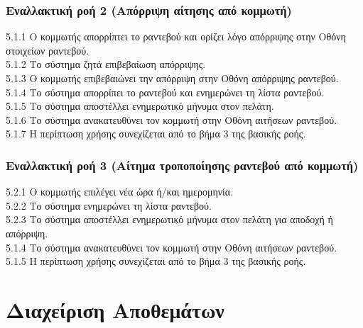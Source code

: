 \documentclass[12pt,a4paper,twoside]{book}
\begin{document}
\subsubsection*{Εναλλακτική ροή 2 (Απόρριψη αίτησης από κομμωτή)}
5.1.1 Ο κομμωτής απορρίπτει το ραντεβού και ορίζει λόγο απόρριψης στην Οθόνη στοιχείων ραντεβού.\\
\hspace*{\parindent}5.1.2 Το σύστημα ζητά επιβεβαίωση απόρριψης.\\
\hspace*{\parindent}5.1.3 Ο κομμωτής επιβεβαιώνει την απόρριψη στην Οθόνη απόρριψης ραντεβού.\\
\hspace*{\parindent}5.1.4 Το σύστημα απορρίπει το ραντεβού και ενημερώνει τη λίστα ραντεβού.\\
\hspace*{\parindent}5.1.5 Το σύστημα αποστέλλει ενημερωτικό μήνυμα στον πελάτη.\\
\hspace*{\parindent}5.1.6 Το σύστημα ανακατευθύνει τον κομμωτή στην Οθόνη αιτήσεων ραντεβού.\\
\hspace*{\parindent}5.1.7 Η περίπτωση χρήσης συνεχίζεται από το βήμα 3 της βασικής ροής.

\subsubsection*{Εναλλακτική ροή 3 (Αίτημα τροποποίησης ραντεβού από κομμωτή)}
5.2.1 Ο κομμωτής επιλέγει νέα ώρα ή/και ημερομηνία.\\
\hspace*{\parindent}5.2.2 Το σύστημα ενημερώνει τη λίστα ραντεβού.\\
\hspace*{\parindent}5.2.3 Το σύστημα αποστέλλει ενημερωτικό μήνυμα στον πελάτη για αποδοχή ή απόρριψη.\\
\hspace*{\parindent}5.1.4 Το σύστημα ανακατευθύνει τον κομμωτή στην Οθόνη αιτήσεων ραντεβού.\\
\hspace*{\parindent}5.1.5 Η περίπτωση χρήσης συνεχίζεται από το βήμα 3 της βασικής ροής.


\section{Διαχείριση Αποθεμάτων}
\end{document}
